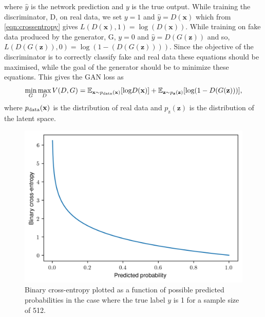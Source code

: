 \documentclass[12pt]{iopart}
\begin{document}
where $\hat{y}$ is the network prediction and $y$ is the true output. While training the discriminator, D, on real data, we set $y = 1$ and $\hat{y} = D(\mathbf{x})$ which from \cref{eqn:crossentropy} gives $L(D(\mathbf{x}),1) = \log(D(\mathbf{x}))$. While training on fake data produced by the generator, G, $y = 0$ and $\hat{y} = D(G(\mathbf{z}))$ and so, $L(D(G(\mathbf{z})),0) = \log(1-(D(G(\mathbf{z}))))$. Since the objective of the discriminator is to correctly classify fake and real data these equations should be maximised, while the goal of the generator should be to minimize these equations. This gives the \ac{GAN} loss as
%
\begin{equation}
   \mathop{\text{min}}_{G}  \mathop{\text{max}}_{D} V(D,G) = \mathbb{E}_{\mathbf{x} \sim p_{\text{\text{data}}}(\mathbf{x})} [\text{log} D(\mathbf{x})] + \mathbb{E}_{\mathbf{z} \sim p_{\mathbf{z}}(\mathbf{z})} [\text{log}(1-D(G(\mathbf{z})))],
 \label{equation:GANloss}
 \end{equation}
where $p_{\text{\text{data}}}(\mathbf{x})$ is the distribution of real data and $p_{\text{z}}(\mathbf{z})$ is the distribution of the latent space. 
\begin{figure}[!h]
    \centering
    \includegraphics{figures/BCE-loss.png}
    \caption{Binary cross-entropy plotted as a function of possible predicted probabilities in the case where the true label $y$ is 1 for a sample size of 512.}
    \label{fig:BCE_loss}
\end{figure}
\end{document}
